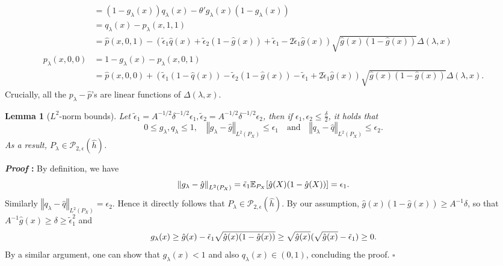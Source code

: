 \documentclass{article}
\def\eps{{\epsilon}}
\def\gP{{\mathcal{P}}}
\newcommand{\E}{\mathbb{E}}
\newcommand\normx[1]{\left\Vert#1\right\Vert}
\newtheorem{lemma}{Lemma}[section]
\renewenvironment{proof}{\noindent\textbf{\textit{Proof }:}}{\hfill$\square$}
\begin{document}
\begin{subequations}
\begin{align}
        &= (1-g_{\lambda}(x))q_{\lambda}(x) - \theta'g_{\lambda}(x)(1-g_{\lambda}(x)) \nonumber \\
        &= q_{\lambda}(x) - p_{\lambda}(x,1,1) \nonumber \\
        &= \hat{p}(x,0,1) - \left(\tilde{\eps}_1\hat{q}(x)+\tilde{\eps}_2(1-\hat{g}(x)) + \tilde{\eps}_1-2\tilde{\eps}_1\hat{g}(x)\right) \sqrt{\hat{g}(x)(1-\hat{g}(x))} \Delta(\lambda,x) \label{eq:binary-density-0-1} \\
        p_{\lambda}(x,0,0) &= 1 - g_{\lambda}(x) - p_{\lambda}(x,0,1) \nonumber \\
        &= \hat{p}(x,0,0) + \left(\tilde{\eps}_1(1-\hat{q}(x))-\tilde{\eps}_2(1-\hat{g}(x)) - \tilde{\eps}_1+2\tilde{\eps}_1\hat{g}(x)\right) \sqrt{\hat{g}(x)(1-\hat{g}(x))} \Delta(\lambda,x). \label{eq:binary-density-0-0}
    \end{align}
\end{subequations}
Crucially, all the $p_{\lambda}-\hat{p}$'s are linear functions of $\Delta(\lambda,x)$.

\begin{lemma}[$L^2$-norm bounds]
    \label{lemma:binary-lipschitz}
    Let $\tilde{\eps}_1 = A^{-1/2}\delta^{-1/2}\eps_1,\tilde{\eps}_2 = A^{-1/2}\delta^{-1/2}\eps_2$, then if $\eps_1,\eps_2\leq\frac{\delta}{2}$, it holds that
    \begin{equation}
        \label{eq:binary-lipschitz}
        0\leq g_{\lambda},q_{\lambda}\leq 1,\quad \normx{g_{\lambda}-\hat{g}}_{L^2(P_X)} \leq \eps_1\quad\text{and}\quad\normx{q_{\lambda}-\hat{q}}_{L^2(P_X)}\leq\eps_2.
    \end{equation}
    As a result, $P_{\lambda}\in\gP_{2,\eps}(\hat{h})$.
\end{lemma}

\begin{proof}
    By definition, we have
    \begin{equation}
        \notag
        \normx{g_{\lambda}-\hat{g}}_{L^2(P_X)} = \tilde{\eps}_1 \E_{P_X}[\hat{g}(X)(1-\hat{g}(X))] = \eps_1.
    \end{equation}
    Similarly $\normx{q_{\lambda}-\hat{q}}_{L^2(P_X)}=\eps_2$. Hence it  directly follows that $P_{\lambda}\in\gP_{2,\eps}(\hat{h})$. By our assumption, $\hat{g}(x)(1-\hat{g}(x))\geq A^{-1}\delta$, so that $A^{-1}\hat{g}(x)\geq\delta\geq\tilde{\eps}_1^2$ and
    \begin{equation}
        \notag
        g_{\lambda}(x) \geq \hat{g}(x) - \tilde{\eps}_1\sqrt{\hat{g}(x)(1-\hat{g}(x))} \geq \sqrt{\hat{g}(x)}(\sqrt{\hat{g}(x)}-\tilde{\eps}_1) \geq 0.
    \end{equation}
    By a similar argument, one can show that $g_{\lambda}(x) < 1$ and also $q_{\lambda}(x)\in(0,1)$, concluding the proof.
\end{proof}
\end{document}
